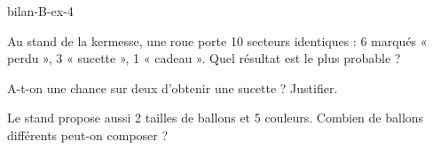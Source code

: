 \begin{blocEdition}{bilan-B-ex-4}
\begin{questions}
\item Au stand de la kermesse, une roue porte 10 secteurs identiques : 6 marqués « perdu », 3 « sucette », 1 « cadeau ». Quel résultat est le plus probable ?
\item A-t-on une chance sur deux d’obtenir une sucette ? Justifier.
\item Le stand propose aussi 2 tailles de ballons et 5 couleurs. Combien de ballons différents peut-on composer ?
\end{questions}\par{}\par\par{}\par{}\par{}\par{}\par{}\par{}
\end{blocEdition}
